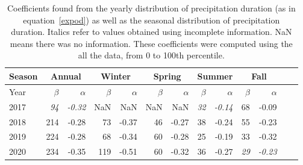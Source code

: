 \begin{table}[htb]
  \begin{center}
    \begin{tabular}{|l|*{11}{r|}r|}
      \hline
      Season    &       \multicolumn{2}{|c|}{Annual}          & \multicolumn{2}{|c|}{Winter}& \multicolumn{2}{|c|}{Spring}  & \multicolumn{2}{|c|}{Summer} &\multicolumn{2}{|c|}{Fall}  \\
      \hline
      Year      & $\beta $ & $\alpha$  & $\beta $ & $\alpha$ & $\beta $ & $\alpha$ & $\beta $ & $\alpha$ & $\beta $ & $\alpha$\\
      \hline
      2017      & \textit{94}  & \textit{-0.32}  & NaN & NaN & NaN & NaN & \textit{32}  & \textit{-0.14}  & 68  & -0.09  \\
      2018      & 214           & -0.28  & 73 & -0.37 & 46 & -0.27 & 38  & -0.24  & 55 & -0.23  \\
      2019      & 224          & -0.28  & 68  & -0.34 & 60 & -0.28 & 25 & -0.19  & 33 &  -0.32 \\
      2020      & 234           & -0.35   & 119  & -0.51 & 60  & -0.32 & 36  & -0.27 & \textit{29} & \textit{-0.23}\\
      \hline
    \end{tabular}
  \end{center}
\caption[Yearly comparison of
  coefficients of precipitation duration using 0 to 100th percentile]{\label{firsttable_100} Coefficients found from the yearly
  distribution of precipitation duration (as in equation~\ref{expod})
  as well as the seasonal distribution of precipitation
  duration. Italics refer to values obtained using incomplete
  information. NaN means there was no information. These coefficients were computed using the all the data, from 0 to 100th percentile.}
\end{table}

